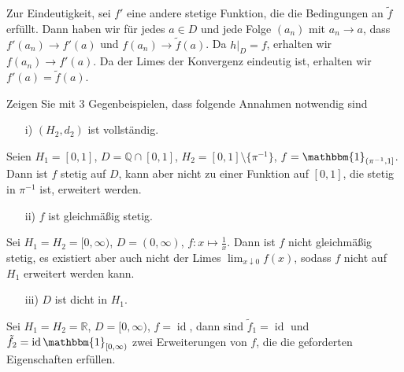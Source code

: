 \documentclass{article}
\begin{document}
Zur Eindeutigkeit, sei $f'$ eine andere stetige Funktion, die die Be\-din\-gun\-gen an $\tilde{f}$ erfüllt.
Dann haben wir für jedes $a\in D$ und jede Folge $(a_n)$ mit $a_n\to a$, dass $f'(a_n)\to f'(a)$ und $f(a_n)\to \tilde{f}(a)$.
Da $h|_D=f$, erhalten wir $f(a_n)\to f'(a)$.
Da der Limes der Konvergenz eindeutig ist, erhalten wir $f'(a)=\tilde{f}(a)$.

\noindent Zeigen Sie mit 3 Gegenbeispielen, dass folgende Annahmen notwendig sind
\begin{itemize}
\item [i)] $(H_2,d_2)$ ist vollständig.
\end{itemize}
Seien $H_1=[0,1]$, $D=\mathbb{Q}\cap[0,1]$, $H_2=[0,1]\setminus\{\pi^{-1}\}$, $f=\mathbbm{1}_{(\pi^{-1},1]}$.
Dann ist $f$ stetig auf $D$, kann aber nicht zu einer Funktion auf $[0,1]$, die stetig in $\pi^{-1}$ ist, erweitert werden.
\begin{itemize}
\item [ii)] $f$ ist gleichmäßig stetig.
\end{itemize}
Sei $H_1=H_2=[0,\infty)$, $D=(0,\infty)$, $f\colon x\mapsto \frac{1}{x}$.
Dann ist $f$ nicht gleichmäßig stetig, es existiert aber auch nicht der Limes $\lim_{x\downarrow 0}f(x)$, sodass $f$ nicht auf $H_1$ erweitert werden kann.
\begin{itemize}
\item [iii)] $D$ ist dicht in $H_1$.
\end{itemize}
Sei $H_1=H_2=\mathbb{R}$, $D=[0,\infty)$, $f=\operatorname{id}$, dann sind $\tilde{f}_1=\operatorname{id}$ und $\tilde{f}_2=\operatorname{id}\mathbbm{1}_{[0,\infty)}$ zwei Erweiterungen von $f$, die die geforderten Eigenschaften erfüllen.

\end{document}
